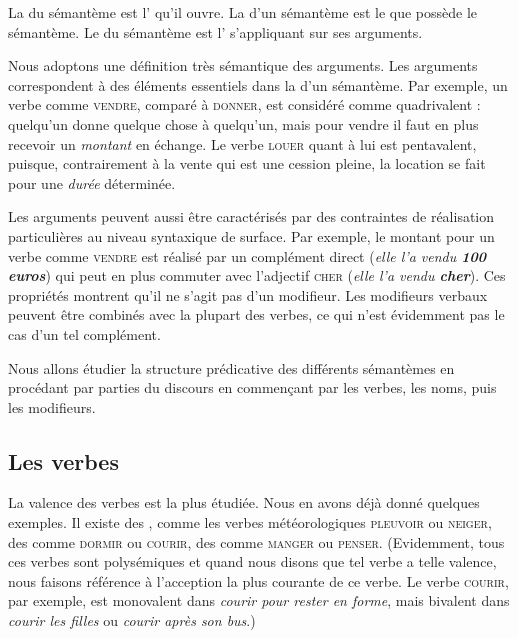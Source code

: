 {La  du sémantème est l’ qu’il ouvre. La  d’un sémantème est le  que possède le sémantème. Le  du sémantème est l’ s’appliquant sur ses arguments.}

Nous adoptons une définition très sémantique des arguments. Les arguments correspondent à des éléments essentiels dans la  d’un sémantème. Par exemple, un verbe comme \textsc{vendre}, comparé à \textsc{donner}, est considéré comme quadrivalent : quelqu’un donne quelque chose à quelqu’un, mais pour vendre il faut en plus recevoir un \textit{montant} en échange. Le verbe \textsc{louer} quant à lui est pentavalent, puisque, contrairement à la vente qui est une cession pleine, la location se fait pour une \textit{durée} déterminée.

Les arguments peuvent aussi être caractérisés par des contraintes de réalisation particulières au niveau syntaxique de surface. Par exemple, le montant pour un verbe comme \textsc{vendre} est réalisé par un complément direct (\textit{elle l’a vendu \textbf{100 euros}}) qui peut en plus commuter avec l’adjectif \textsc{cher} (\textit{elle l’a vendu \textbf{cher}}). Ces propriétés montrent qu’il ne s’agit pas d’un modifieur. Les modifieurs verbaux peuvent être combinés avec la plupart des verbes, ce qui n’est évidemment pas le cas d’un tel complément.

Nous allons étudier la structure prédicative des différents sémantèmes en procédant par parties du discours en commençant par les verbes, les noms, puis les modifieurs.

\subsection{Les verbes}
La valence des verbes est la plus étudiée. Nous en avons déjà donné quelques exemples. Il existe des , comme les verbes météorologiques \textsc{pleuvoir} ou \textsc{neiger}, des  comme \textsc{dormir} ou \textsc{courir}, des  comme \textsc{manger} ou \textsc{penser}. (Evidemment, tous ces verbes sont polysémiques et quand nous disons que tel verbe a telle valence, nous faisons référence à l’acception la plus courante de ce verbe. Le verbe \textsc{courir}, par exemple, est monovalent dans \textit{courir pour rester en forme}, mais bivalent dans \textit{courir les filles} ou \textit{courir après son bus}.) 

